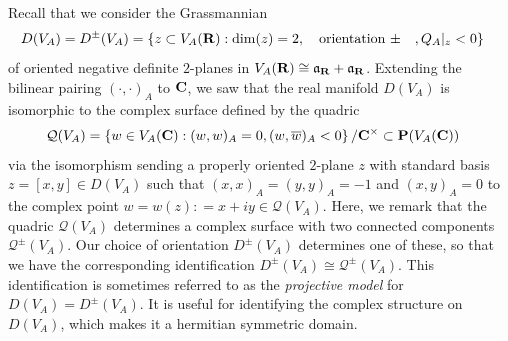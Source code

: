 \documentclass{amsart}
\theoremstyle{definition}
\theoremstyle{definition}
\theoremstyle{definition}
\begin{document}
Recall that we consider the Grassmannian 
\begin{align*} D(V_A) = D^{\pm}(V_A) 
&= \left\lbrace z \subset V_A({\bf{R}}): \dim(z) = 2, ~~~\text{orientation $\pm$}~~~, Q_A\vert_z <0 \right\rbrace \end{align*} 
of oriented negative definite $2$-planes in 
$V_A( {\bf{R}} ) \cong \mathfrak{a}_{ {\bf{R}} } + \mathfrak{a}_{ {\bf{R}} }$. 
Extending the bilinear pairing $(\cdot, \cdot)_A$ to ${\bf{C}}$, we saw that the real manifold $D(V_A)$ is isomorphic to the complex surface defined by the quadric
\begin{align*} \mathcal{Q}(V_A) &= \left\lbrace w \in V_A({\bf{C}}): (w, w)_A = 0, (w, \overline{w})_A < 0 \right\rbrace / {\bf{C}}^{\times} \subset {\bf{P}}(V_A({\bf{C}})) \end{align*}
via the isomorphism sending a properly oriented $2$-plane $z$ with standard basis $z = [x, y] \in D(V_A)$ such that $(x,x)_A = (y,y)_A = -1$ 
and $(x,y)_A =0$ to the complex point $w  = w(z): = x + iy \in \mathcal{Q}(V_A)$. Here, we remark that the quadric $\mathcal{Q}(V_A)$ determines
a complex surface with two connected components $\mathcal{Q}^{\pm}(V_A)$. Our choice of orientation $D^{\pm}(V_A)$ determines one of these,
so that we have the corresponding identification $D^{\pm}(V_A) \cong \mathcal{Q}^{\pm}(V_A)$.
This identification is sometimes referred to as the {\it{projective model}} for $D(V_A) = D^{\pm}(V_A)$.
It is useful for identifying the complex structure on $D(V_A)$, which makes it a hermitian symmetric domain.
\end{document}
